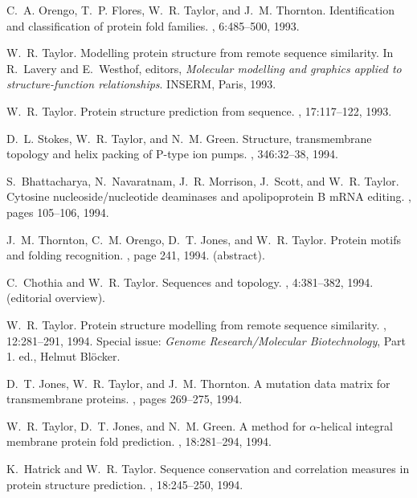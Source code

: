 \begin{thebibliography}{100}
C.~A. Orengo, T.~P. Flores, W.~R. Taylor, and J.~M. Thornton.
\newblock Identification and classification of protein fold families.
, 6:485--500, 1993.

W.~R. Taylor.
\newblock Modelling protein structure from remote sequence similarity.
\newblock In R.~Lavery and E.~Westhof, editors, {\em Molecular modelling and
  graphics applied to structure-function relationships}. INSERM, Paris, 1993.

W.~R. Taylor.
\newblock Protein structure prediction from sequence.
, 17:117--122, 1993.

D.~L. Stokes, W.~R. Taylor, and N.~M. Green.
\newblock Structure, transmembrane topology and helix packing of {P}-type ion
  pumps.
, 346:32--38, 1994.

S.~Bhattacharya, N.~Navaratnam, J.~R. Morrison, J.~Scott, and W.~R. Taylor.
\newblock Cytosine nucleoside/nucleotide deaminases and apolipoprotein {B}
  m{RNA} editing.
, pages 105--106, 1994.

J.~M. Thornton, C.~M. Orengo, D.~T. Jones, and W.~R. Taylor.
\newblock Protein motifs and folding recognition.
, page 241, 1994.
\newblock (abstract).

C.~Chothia and W.~R. Taylor.
\newblock Sequences and topology.
, 4:381--382, 1994.
\newblock (editorial overview).

W.~R. Taylor.
\newblock Protein structure modelling from remote sequence similarity.
, 12:281--291, 1994.
\newblock Special issue: {\em Genome Research/Molecular Biotechnology}, Part 1.
  ed., Helmut Bl{\"o}cker.

D.~T. Jones, W.~R. Taylor, and J.~M. Thornton.
\newblock A mutation data matrix for transmembrane proteins.
, pages 269--275, 1994.

W.~R. Taylor, D.~T. Jones, and N.~M. Green.
\newblock A method for $\alpha$-helical integral membrane protein fold
  prediction.
, 18:281--294, 1994.

K.~Hatrick and W.~R. Taylor.
\newblock Sequence conservation and correlation measures in protein structure
  prediction.
, 18:245--250, 1994.


\end{thebibliography}
